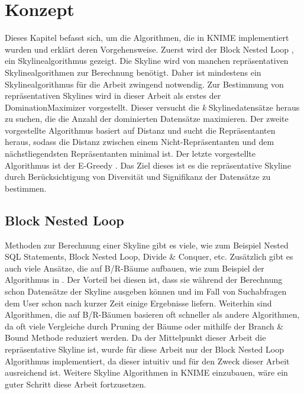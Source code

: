 \chapter{Konzept}
\label{ch:Konzept}
Dieses Kapitel befasst sich, um die Algorithmen, die in KNIME implementiert wurden und erklärt deren Vorgehensweise. Zuerst wird der Block Nested Loop \cite{borzsony2001skyline}, ein Skylinealgorithmus gezeigt. Die Skyline wird von manchen repräsentativen Skylinealgorithmen zur Berechnung benötigt. Daher ist mindestens ein Skylinealgorithmus für die Arbeit zwingend notwendig. Zur Bestimmung von repräsentativen Skylines wird in dieser Arbeit als erstes der DominationMaximizer \cite{4221657} vorgestellt. Dieser versucht die \textit{k} Skylinedatensätze heraus zu suchen, die die Anzahl der dominierten Datensätze maximieren. Der zweite vorgestellte Algorithmus basiert auf Distanz \cite{Tao:2009:DRS:1546683.1547325} und sucht die Repräsentanten heraus, sodass die Distanz zwischen einem Nicht-Repräsentanten und dem nächstliegendsten Repräsentanten minimal ist. Der letzte vorgestellte Algorithmus ist der E-Greedy \cite{magnani2014taking}. Das Ziel dieses ist es die repräsentative Skyline durch Berücksichtigung von Diversität und Signifikanz der Datensätze zu bestimmen.
\section{Block Nested Loop}
\label{ch:Analyse:sec:skyAlgos}
Methoden zur Berechnung einer Skyline gibt es viele, wie zum Beispiel Nested SQL Statements, Block Nested Loop, Divide \& Conquer, etc.
Zusätzlich gibt es auch viele Ansätze, die auf B/R-Bäume aufbauen, wie zum Beispiel der Algorithmus in \cite{Papadias:2003:OPA:872757.872814}. Der Vorteil bei diesen ist, dass sie während der Berechnung schon Datensätze der Skyline ausgeben können und im Fall von Suchabfragen dem User schon nach kurzer Zeit einige Ergebnisse liefern. Weiterhin sind Algorithmen, die auf B/R-Bäumen basieren oft schneller als andere Algorithmen, da oft viele Vergleiche durch Pruning der Bäume oder mithilfe der Branch \& Bound Methode reduziert werden. 
Da der Mittelpunkt dieser Arbeit die repräsentative Skyline ist, wurde für diese Arbeit nur der Block Nested Loop Algorithmus implementiert, da dieser intuitiv und für den Zweck dieser Arbeit ausreichend ist. Weitere Skyline Algorithmen in KNIME einzubauen, wäre ein guter Schritt diese Arbeit fortzusetzen. 

